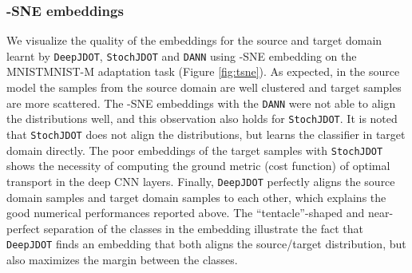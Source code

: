 \documentclass[runningheads]{llncs}
\begin{document}
\subsubsection{-SNE embeddings} 
We visualize the quality of the embeddings for the source and target domain learnt by \texttt{DeepJDOT}, \texttt{StochJDOT} and \texttt{DANN} using -SNE embedding on the MNISTMNIST-M adaptation task (Figure \ref{fig:tsne}). As expected, in the source model the samples from the source domain are well clustered and target samples are more scattered. The -SNE embeddings with the \texttt{DANN} were not able to align the distributions well, and this observation also holds for \texttt{StochJDOT}. It is noted that \texttt{StochJDOT} does not align the distributions, but learns the classifier in target domain directly. The poor embeddings of the target samples with \texttt{StochJDOT} shows the necessity of computing the ground metric (cost function) of optimal transport in the deep CNN layers. Finally, \texttt{DeepJDOT} perfectly aligns the source domain samples and target domain samples to each other, which explains the good numerical performances reported above. The ``tentacle''-shaped and near-perfect separation of the classes in the embedding illustrate the fact that \texttt{DeepJDOT} finds an embedding that both aligns the source/target distribution, but also maximizes the margin between the classes.
\end{document}
